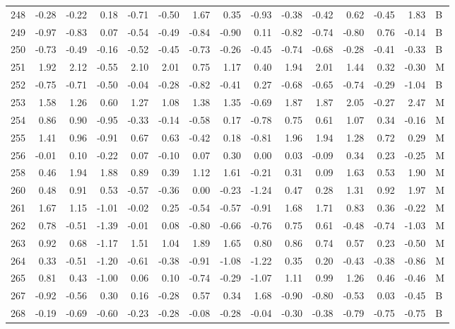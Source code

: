 \begin{table}[ht]
\begin{tabular}{rrrrrrrrrrrrrrl}
  248 & -0.28 & -0.22 & 0.18 & -0.71 & -0.50 & 1.67 & 0.35 & -0.93 & -0.38 & -0.42 & 0.62 & -0.45 & 1.83 & B \\ 
  249 & -0.97 & -0.83 & 0.07 & -0.54 & -0.49 & -0.84 & -0.90 & 0.11 & -0.82 & -0.74 & -0.80 & 0.76 & -0.14 & B \\ 
  250 & -0.73 & -0.49 & -0.16 & -0.52 & -0.45 & -0.73 & -0.26 & -0.45 & -0.74 & -0.68 & -0.28 & -0.41 & -0.33 & B \\ 
  251 & 1.92 & 2.12 & -0.55 & 2.10 & 2.01 & 0.75 & 1.17 & 0.40 & 1.94 & 2.01 & 1.44 & 0.32 & -0.30 & M \\ 
  252 & -0.75 & -0.71 & -0.50 & -0.04 & -0.28 & -0.82 & -0.41 & 0.27 & -0.68 & -0.65 & -0.74 & -0.29 & -1.04 & B \\ 
  253 & 1.58 & 1.26 & 0.60 & 1.27 & 1.08 & 1.38 & 1.35 & -0.69 & 1.87 & 1.87 & 2.05 & -0.27 & 2.47 & M \\ 
  254 & 0.86 & 0.90 & -0.95 & -0.33 & -0.14 & -0.58 & 0.17 & -0.78 & 0.75 & 0.61 & 1.07 & 0.34 & -0.16 & M \\ 
  255 & 1.41 & 0.96 & -0.91 & 0.67 & 0.63 & -0.42 & 0.18 & -0.81 & 1.96 & 1.94 & 1.28 & 0.72 & 0.29 & M \\ 
  256 & -0.01 & 0.10 & -0.22 & 0.07 & -0.10 & 0.07 & 0.30 & 0.00 & 0.03 & -0.09 & 0.34 & 0.23 & -0.25 & M \\ 
  258 & 0.46 & 1.94 & 1.88 & 0.89 & 0.39 & 1.12 & 1.61 & -0.21 & 0.31 & 0.09 & 1.63 & 0.53 & 1.90 & M \\ 
  260 & 0.48 & 0.91 & 0.53 & -0.57 & -0.36 & 0.00 & -0.23 & -1.24 & 0.47 & 0.28 & 1.31 & 0.92 & 1.97 & M \\ 
  261 & 1.67 & 1.15 & -1.01 & -0.02 & 0.25 & -0.54 & -0.57 & -0.91 & 1.68 & 1.71 & 0.83 & 0.36 & -0.22 & M \\ 
  262 & 0.78 & -0.51 & -1.39 & -0.01 & 0.08 & -0.80 & -0.66 & -0.76 & 0.75 & 0.61 & -0.48 & -0.74 & -1.03 & M \\ 
  263 & 0.92 & 0.68 & -1.17 & 1.51 & 1.04 & 1.89 & 1.65 & 0.80 & 0.86 & 0.74 & 0.57 & 0.23 & -0.50 & M \\ 
  264 & 0.33 & -0.51 & -1.20 & -0.61 & -0.38 & -0.91 & -1.08 & -1.22 & 0.35 & 0.20 & -0.43 & -0.38 & -0.86 & M \\ 
  265 & 0.81 & 0.43 & -1.00 & 0.06 & 0.10 & -0.74 & -0.29 & -1.07 & 1.11 & 0.99 & 1.26 & 0.46 & -0.46 & M \\ 
  267 & -0.92 & -0.56 & 0.30 & 0.16 & -0.28 & 0.57 & 0.34 & 1.68 & -0.90 & -0.80 & -0.53 & 0.03 & -0.45 & B \\ 
  268 & -0.19 & -0.69 & -0.60 & -0.23 & -0.28 & -0.08 & -0.28 & -0.04 & -0.30 & -0.38 & -0.79 & -0.75 & -0.75 & B \\ 

\end{tabular}
\end{table}

